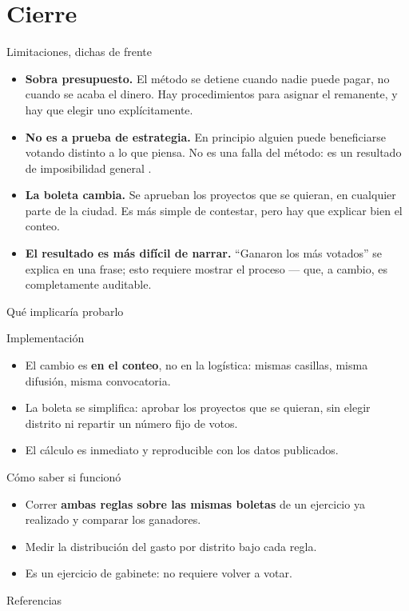 \documentclass[11pt, aspectratio=169]{beamer}
\begin{document}
\section{Cierre}

\begin{frame}{Limitaciones, dichas de frente}
  \begin{itemize}
    \item \textbf{Sobra presupuesto.} El método se detiene cuando nadie puede
      pagar, no cuando se acaba el dinero. Hay procedimientos para asignar el
      remanente, y hay que elegir uno explícitamente.
    \item \textbf{No es a prueba de estrategia.} En principio alguien puede
      beneficiarse votando distinto a lo que piensa. No es una falla del método:
      es un resultado de imposibilidad general \citep{peters2018}.
    \item \textbf{La boleta cambia.} Se aprueban los proyectos que se quieran,
      en cualquier parte de la ciudad. Es más simple de contestar, pero hay que
      explicar bien el conteo.
    \item \textbf{El resultado es más difícil de narrar.} ``Ganaron los más
      votados'' se explica en una frase; esto requiere mostrar el proceso ---
      que, a cambio, es completamente auditable.
  \end{itemize}
\end{frame}

\begin{frame}{Qué implicaría probarlo}
  \begin{block}{Implementación}
    \begin{itemize}\small
      \item El cambio es \textbf{en el conteo}, no en la logística: mismas
        casillas, misma difusión, misma convocatoria.
      \item La boleta se simplifica: aprobar los proyectos que se quieran, sin
        elegir distrito ni repartir un número fijo de votos.
      \item El cálculo es inmediato y reproducible con los datos publicados.
    \end{itemize}
  \end{block}

  \begin{block}{Cómo saber si funcionó}
    \begin{itemize}\small
      \item Correr \textbf{ambas reglas sobre las mismas boletas} de un
        ejercicio ya realizado y comparar los ganadores.
      \item Medir la distribución del gasto por distrito bajo cada regla.
      \item Es un ejercicio de gabinete: no requiere volver a votar.
    \end{itemize}
  \end{block}
\end{frame}

\begin{frame}[allowframebreaks]{Referencias}
  \scriptsize
  
  
\end{frame}
\end{document}
